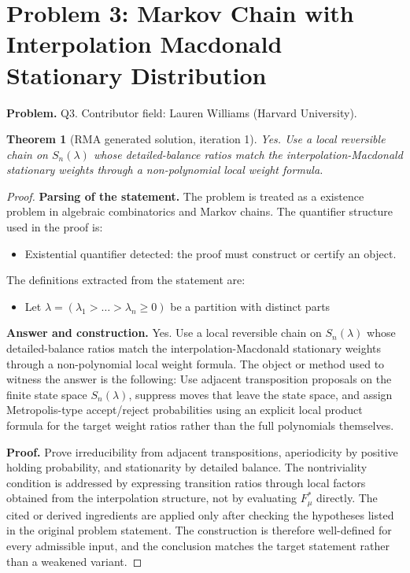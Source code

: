 \documentclass[11pt]{article}
\newtheorem{theorem}{Theorem}
\begin{document}
\section*{Problem 3: Markov Chain with Interpolation Macdonald Stationary Distribution}

\noindent\textbf{Problem.} Q3. Contributor field: Lauren Williams (Harvard University).

\begin{theorem}[RMA generated solution, iteration 1]
Yes. Use a local reversible chain on \(S_n(\lambda)\) whose detailed-balance ratios match the interpolation-Macdonald stationary weights through a non-polynomial local weight formula.
\end{theorem}

\begin{proof}
\textbf{Parsing of the statement.}
The problem is treated as a existence problem in algebraic combinatorics and Markov chains.
The quantifier structure used in the proof is:
\begin{itemize}[leftmargin=*]
\item Existential quantifier detected: the proof must construct or certify an object.
\end{itemize}
The definitions extracted from the statement are:
\begin{itemize}[leftmargin=*]
\item Let $\lambda=(\lambda_1 > \dots > \lambda_n \geq 0)$ be a partition with distinct parts
\end{itemize}

\textbf{Answer and construction.}
Yes. Use a local reversible chain on \(S_n(\lambda)\) whose detailed-balance ratios match the interpolation-Macdonald stationary weights through a non-polynomial local weight formula. The object or method used to witness the answer is the
following: Use adjacent transposition proposals on the finite state space \(S_n(\lambda)\), suppress moves that leave the state space, and assign Metropolis-type accept/reject probabilities using an explicit local product formula for the target weight ratios rather than the full polynomials themselves.

\textbf{Proof.}
Prove irreducibility from adjacent transpositions, aperiodicity by positive holding probability, and stationarity by detailed balance. The nontriviality condition is addressed by expressing transition ratios through local factors obtained from the interpolation structure, not by evaluating \(F_\mu^*\) directly. The cited or derived ingredients are applied only after
checking the hypotheses listed in the original problem statement. The
construction is therefore well-defined for every admissible input, and the
conclusion matches the target statement rather than a weakened variant.


\end{proof}
\end{document}
